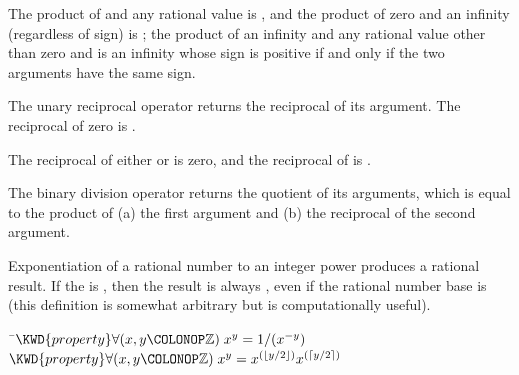 The product of
 and any rational value is , and the product of
zero and an infinity (regardless of sign) is ;
the product of an infinity and any rational value other than zero and 
is an infinity whose sign is positive if and only if the two arguments have the same sign.



The unary reciprocal operator \EXP{/} returns the reciprocal of its argument.
The reciprocal of zero is \EXP{+\infty}.

The reciprocal of
either \EXP{+\infty} or \EXP{-\infty} is zero, and the reciprocal of  is .



The binary division operator \EXP{/} returns the quotient of its arguments,
which is equal to the product of (a) the first argument and (b) the reciprocal of the second argument.



Exponentiation of a rational number to an integer power produces a rational result.
If the  is , then the result is always , even if the rational number base is 
(this definition is somewhat arbitrary but is computationally useful).

\begin{Fortress}
{\tt~}\pushtabs\=\+\( \KWD{property} \forall(x, y\COLONOP\mathbb{Z})\; x^{y} = 1/(x^{-y})\)\\
\( \KWD{property} \forall(x, y\COLONOP\mathbb{Z})\; x^{y} = x^{(\lfloor y/2 \rfloor)} x^{(\lceil y/2 \rceil)}\)\-\\\poptabs
\end{Fortress}



